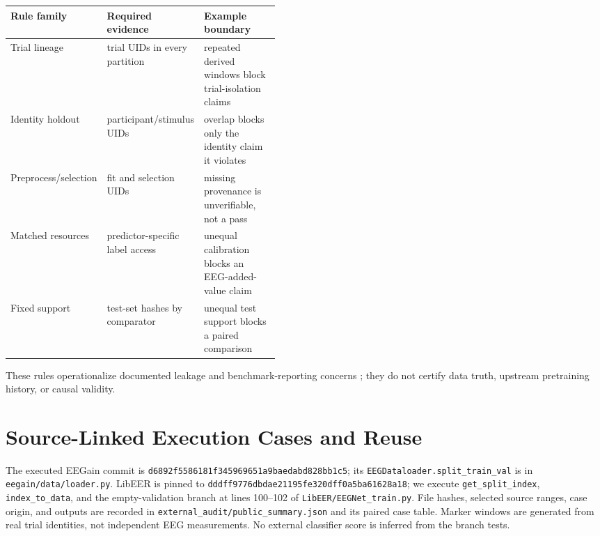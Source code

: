 \begin{center}
\small\setlength{\tabcolsep}{4pt}
\begin{tabularx}{\linewidth}{>{\raggedright\arraybackslash}p{0.18\linewidth}>{\raggedright\arraybackslash}p{0.27\linewidth}>{\raggedright\arraybackslash}X}
\toprule
Rule family & Required evidence & Example boundary \\
\midrule
Trial lineage & trial UIDs in every partition & repeated derived windows block trial-isolation claims \\
Identity holdout & participant/stimulus UIDs & overlap blocks only the identity claim it violates \\
Preprocess/selection & fit and selection UIDs & missing provenance is unverifiable, not a pass \\
Matched resources & predictor-specific label access & unequal calibration blocks an EEG-added-value claim \\
Fixed support & test-set hashes by comparator & unequal test support blocks a paired comparison \\
\bottomrule
\end{tabularx}
\end{center}
These rules operationalize documented leakage and benchmark-reporting concerns
\citep{brookshire2024leakage,lei2025leakage,bendrich2022feature,reuel2024betterbench};
they do not certify data truth, upstream pretraining history, or causal validity.

\section{Source-Linked Execution Cases and Reuse}
\label{app:execution-cases}
The executed EEGain commit is
\texttt{d6892f5586181f345969651a9baedabd828bb1c5}; its
\texttt{EEGDataloader.split\_train\_val} is in
\texttt{eegain/data/loader.py}. LibEER is pinned to
\texttt{dddff9776dbdae21195fe320dff0a5ba61628a18}; we execute
\texttt{get\_split\_index}, \texttt{index\_to\_data}, and the empty-validation
branch at lines 100--102 of \texttt{LibEER/EEGNet\_train.py}.
File hashes, selected source ranges, case origin, and outputs are recorded in
\texttt{external\_audit/public\_summary.json} and its paired case table.
Marker windows are generated from real trial identities, not independent EEG
measurements. No external classifier score is inferred from the branch tests.

